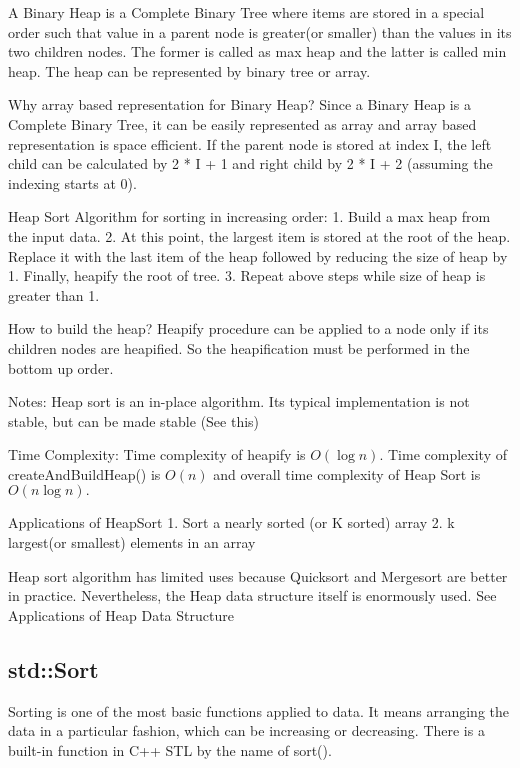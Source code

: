 \documentclass{article}
\begin{document}
A Binary Heap is a Complete Binary Tree where items are stored in a special order such that value in a parent node is greater(or smaller) than the values in its two children nodes. The former is called as max heap and the latter is called min heap. The heap can be represented by binary tree or array.



Why array based representation for Binary Heap?
Since a Binary Heap is a Complete Binary Tree, it can be easily represented as array and array based representation is space efficient. If the parent node is stored at index I, the left child can be calculated by 2 * I + 1 and right child by 2 * I + 2 (assuming the indexing starts at 0).

Heap Sort Algorithm for sorting in increasing order:
1. Build a max heap from the input data.
2. At this point, the largest item is stored at the root of the heap. Replace it with the last item of the heap followed by reducing the size of heap by 1. Finally, heapify the root of tree.
3. Repeat above steps while size of heap is greater than 1.

How to build the heap?
Heapify procedure can be applied to a node only if its children nodes are heapified. So the heapification must be performed in the bottom up order.



Notes:
Heap sort is an in-place algorithm.
Its typical implementation is not stable, but can be made stable (See this)

Time Complexity: Time complexity of heapify is $O(\log n)$. Time complexity of createAndBuildHeap() is $O(n)$ and overall time complexity of Heap Sort is $O(n\log n).$

Applications of HeapSort
1. Sort a nearly sorted (or K sorted) array
2. k largest(or smallest) elements in an array

Heap sort algorithm has limited uses because Quicksort and Mergesort are better in practice. Nevertheless, the Heap data structure itself is enormously used. See Applications of Heap Data Structure



\subsection{std::Sort}

Sorting is one of the most basic functions applied to data. It means arranging the data in a particular fashion, which can be increasing or decreasing. There is a built-in function in C++ STL by the name of sort().
\end{document}
